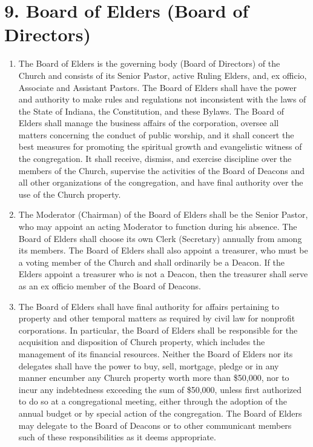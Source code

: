 \documentclass[
]{book}
\begin{document}
\hypertarget{board-of-elders-board-of-directors}{%
\section*{9. Board of Elders (Board of Directors)}\label{board-of-elders-board-of-directors}}

\begin{enumerate}
\def\labelenumi{\alph{enumi}.}
\item
  The Board of Elders is the governing body (Board of Directors) of the Church and consists of its Senior Pastor, active Ruling Elders, and, ex officio, Associate and Assistant Pastors. The Board of Elders shall have the power and authority to make rules and regulations not inconsistent with the laws of the State of Indiana, the Constitution, and these Bylaws. The Board of Elders shall manage the business affairs of the corporation, oversee all matters concerning the conduct of public worship, and it shall concert the best measures for promoting the spiritual growth and evangel­istic witness of the congregation. It shall receive, dismiss, and exercise discipline over the members of the Church, supervise the activities of the Board of Deacons and all other organizations of the congregation, and have final authority over the use of the Church property.
\item
  The Moderator (Chairman) of the Board of Elders shall be the Senior Pastor, who may appoint an acting Moderator to function during his absence. The Board of Elders shall choose its own Clerk (Secretary) annually from among its members. The Board of Elders shall also appoint a treasurer, who must be a voting member of the Church and shall ordinarily be a Deacon. If the Elders appoint a treasurer who is not a Deacon, then the treasurer shall serve as an ex officio member of the Board of Deacons.
\item
  The Board of Elders shall have final authority for affairs pertaining to property and other temporal matters as required by civil law for nonprofit corporations. In particular, the Board of Elders shall be responsible for the acquisition and disposition of Church property, which includes the management of its financial resources. Neither the Board of Elders nor its delegates shall have the power to buy, sell, mortgage, pledge or in any manner encumber any Church property worth more than \$50,000, nor to incur any indebted­ness exceeding the sum of \$50,000, unless first authorized to do so at a congregational meeting, either through the adoption of the annual budget or by special action of the congregation. The Board of Elders may delegate to the Board of Deacons or to other communicant members such of these responsibilities as it deems approp­riate.

\end{enumerate}
\end{document}
